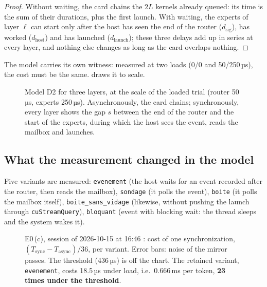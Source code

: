 \begin{proof}
Without waiting, the card chains the $2L$ kernels already queued: its time is the sum of their durations, plus the first launch. With waiting, the experts of layer $\ell$ can start only after the host has seen the end of the router ($d_{\mathrm{sig}}$), has worked ($d_{\mathrm{host}}$) and has launched ($d_{\mathrm{launch}}$); these three delays add up in series at every layer, and nothing else changes as long as the card overlaps nothing.
\end{proof}

The model carries its own witness: measured at two loads (0/0 and 50/250\,µs), the cost must be the same.  draws it to scale.

\begin{figure}[ht]
\centering
\SchemaChmSync
\caption[Model D2, to scale]{Model D2 for three layers, at the scale of the loaded trial (router 50\,µs, experts 250\,µs). Asynchronously, the card chains; synchronously, every layer shows the gap $s$ between the end of the router and the start of the experts, during which the host sees the event, reads the mailbox and launches.}
\label{fig:t2c-sync-modele}
\end{figure}

\subsection{What the measurement changed in the model}

Five variants are measured: \texttt{evenement} (the host waits for an event recorded after the router, then reads the mailbox), \texttt{sondage} (it polls the event), \texttt{boite} (it polls the mailbox itself), \texttt{boite\_\allowbreak sans\_\allowbreak vidage} (likewise, without pushing the launch through \texttt{cuStreamQuery}), \texttt{bloquant} (event with blocking wait: the thread sleeps and the system wakes it).

\begin{figure}[ht]
\centering
\GrapheChmSync
\caption[E0\,(c): cost of a synchronization, empty and loaded]{E0\,(c), session of 2026-10-15 at 16:46 \mes: cost of one synchronization, $(T_{\mathrm{sync}} - T_{\mathrm{async}})/36$, per variant. Error bars: noise of the mirror passes. The threshold (436\,µs) is off the chart. The retained variant, \texttt{evenement}, costs 18.5\,µs under load, i.e.\ 0.666\,ms per token, \textbf{23 times under the threshold}.}
\label{fig:t2c-sync}
\end{figure}


